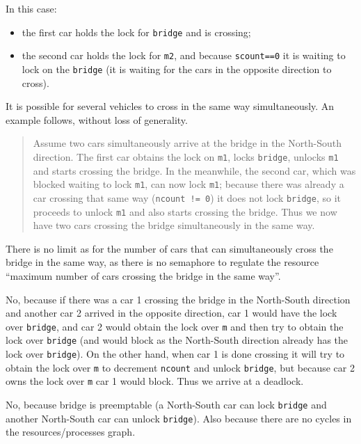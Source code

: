 \documentclass{sope}
\begin{document}
In this case:
\begin{itemize}
    \item the first car holds the lock for \texttt{bridge} and is crossing;
    \item the second car holds the lock for \texttt{m2}, and because \texttt{scount==0} it is waiting to lock on the \texttt{bridge} (it is waiting for the cars in the opposite direction to cross).
\end{itemize}

It is possible for several vehicles to cross in the same way simultaneously. An example follows, without loss of generality.

\begin{quote}
Assume two cars simultaneously arrive at the bridge in the North-South direction. The first car obtains the lock on \texttt{m1}, locks \texttt{bridge}, unlocks \texttt{m1} and starts crossing the bridge. In the meanwhile, the second car, which was blocked waiting to lock \texttt{m1}, can now lock \texttt{m1}; because there was already a car crossing that same way (\texttt{ncount != 0}) it does not lock \texttt{bridge}, so it proceeds to unlock \texttt{m1} and also starts crossing the bridge. Thus we now have two cars crossing the bridge simultaneously in the same way.
\end{quote}

There is no limit as for the number of cars that can simultaneously cross the bridge in the same way, as there is no semaphore to regulate the resource ``maximum number of cars crossing the bridge in the same way''.

No, because if there was a car 1 crossing the bridge in the North-South direction and another car 2 arrived in the opposite direction, car 1 would have the lock over \texttt{bridge}, and car 2 would obtain the lock over \texttt{m} and then try to obtain the lock over \texttt{bridge} (and would block as the North-South direction already has the lock over \texttt{bridge}). On the other hand, when car 1 is done crossing it will try to obtain the lock over \texttt{m} to decrement \texttt{ncount} and unlock \texttt{bridge}, but because car 2 owns the lock over \texttt{m} car 1 would block. Thus we arrive at a deadlock.

No, because bridge is preemptable (a North-South car can lock \texttt{bridge} and another North-South car can unlock \texttt{bridge}). Also because there are no cycles in the resources/processes graph.
\end{document}
